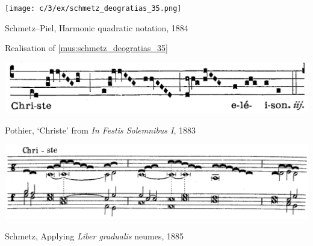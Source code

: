 \vspace*{\fill}

\begin{example}
  \centering
  \texttt{[image: c/3/ex/schmetz\_deogratias\_35.png]}
  \caption{Schmetz--Piel, Harmonic quadratic notation, 1884}
  \label{mus:schmetz_deogratias_35}
\end{example}

\vspace*{\fill}

\begin{example}
  \caption{Realisation of \cref{mus:schmetz_deogratias_35}}
  \label{mus:schmetz_transcription}
\end{example}

\vspace*{\fill}

\clearpage
\vspace*{\fill}
\begin{example}
  \centering
  \includegraphics[width=.8\linewidth]{c/3/ex/pothier_christe_7star.png}
  \caption{Pothier, `Christe' from \emph{In Festis Solemnibus I}, 1883}
  \label{mus:pothier_christe_7star}
\end{example}
\vspace*{\fill}
\begin{example}
  \centering
  \includegraphics[width=\linewidth]{c/3/ex/schmetz_christe_59.png}
  \caption{Schmetz, Applying \emph{Liber gradualis} neumes, 1885}
  \label{mus:schmetz_christe_59}
\end{example}
\vspace*{\fill}
\clearpage


